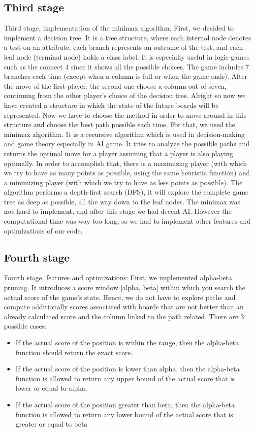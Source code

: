 \documentclass[12pt, a4paper, oneside]{report}
\begin{document}
	\subsection{Third stage}
	Third stage, implementation of the minimax algorithm.
	First, we decided to implement a decision tree. It is a tree structure, where each internal node denotes a test on an attribute, each branch represents an outcome of the test, and each leaf node (terminal node) holds a class label. It is especially useful in logic games such as the connect 4 since it shows all the possible choices. The game includes 7 branches each time (except when a column is full or when the game ends). After the move of the first player, the second one choose a column out of seven, continuing from the other player’s choice of the decision tree.
	Alright so now we have created a structure in which the state of the future boards will be represented. Now we have to choose the method in order to move around in this structure and choose the best path possible each time. For that, we used the minimax algorithm. It is a recursive algorithm which is used in decision-making and game theory especially in AI game. It tries to analyze the possible paths and returns the optimal move for a player assuming that a player is also playing optimally. In order to accomplish that, there is a maximizing player (with which we try to have as many points as possible, using the same heuristic function) and a minimizing player (with which we try to have as less points as possible). The algorithm performs a depth-first search (DFS), it will explore the complete game tree as deep as possible, all the way down to the leaf nodes.
	The minimax was not hard to implement, and after this stage we had  decent AI. However the computational time was way too long, so we had to implement other features and optimizations of our code. \\

	\subsection{Fourth stage}

	Fourth stage, features and optimizations:
	First, we implemented alpha-beta pruning. It introduces a score window [alpha, beta] within which you search the actual score of the game’s state. Hence, we do not have to explore paths and compute  additionally scores associated with boards that are not better than an already calculated score and the column linked to the path related. There are 3 possible cases:
	\begin{itemize}
		\item If the actual score of the position is within the range, then the alpha-beta function should return the exact score.
		\item If the actual score of the position is lower than alpha, then the alpha-beta function is allowed to return any upper bound of the actual score that is lower or equal to alpha.
		\item If the actual score of the position greater than beta, then the alpha-beta function is allowed to return any lower bound of the actual score that is greater or equal to beta
	\end{itemize}
\end{document}
